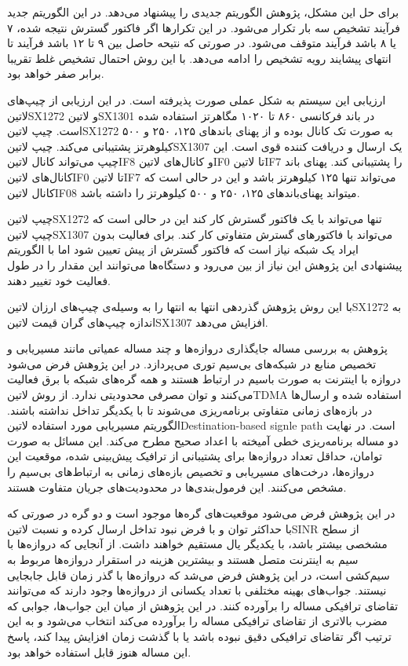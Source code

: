 برای حل این مشکل، پژوهش الگوریتم جدیدی را پیشنهاد می‌دهد. در این الگوریتم جدید فرآیند تشخیص سه بار تکرار می‌شود.
در این تکرارها اگر فاکتور گسترش نتیجه شده، ۷ یا ۸ باشد فرآیند متوقف می‌شود.
در صورتی که نتیحه حاصل بین ۹ تا ۱۲ باشد فرآیند تا انتهای پیشایند رویه تشخیص را ادامه می‌دهد.
با این روش احتمال تشخیص غلط تقریبا برابر صفر خواهد بود.

ارزیابی این سیستم به شکل عملی صورت پذیرفته است. در این ارزیابی از چیپ‌های ‌لاتین{SX1272} و ‌لاتین{SX1301} در باند فرکانسی ۸۶۰ تا ۱۰۲۰ مگاهرتز استفاده شده است.
چیپ ‌لاتین{SX1272} به صورت تک کانال بوده و از پهنای باندهای ۱۲۵، ۲۵۰ و ۵۰۰ کیلوهرتز پشتیبانی می‌کند.
چیپ ‌لاتین{SX1307} یک ارسال و دریافت کننده قوی است. این چیپ می‌تواند کانال ‌لاتین{IF8} و کانال‌های ‌لاتین{IF0} تا ‌لاتین{IF7} را پشتیبانی کند.
پهنای باند کانال‌های ‌لاتین{IF0} تا ‌لاتین{IF7} می‌تواند تنها ۱۲۵ کیلوهرتز باشد و این در حالی است که کانال ‌لاتین{IF08} میتواند پهنای‌باندهای ۱۲۵، ۲۵۰ و ۵۰۰ کیلوهرتز را داشته باشد.

چیپ ‌لاتین{SX1272} تنها می‌تواند با یک فاکتور گسترش کار کند این در حالی است که چیپ ‌لاتین{SX1307} می‌تواند با فاکتورهای گسترش متفاوتی کار کند.
برای فعالیت بدون ایراد یک شبکه نیاز است که فاکتور گسترش از پیش تعیین شود اما با الگوریتم پیشنهادی این پژوهش این نیاز از بین می‌رود و دستگاه‌ها می‌توانند
این مقدار را در طول فعالیت خود تغییر دهند.

با این روش پژوهش گذردهی انتها به انتها را به وسیله‌ی چیپ‌های ارزان ‌لاتین{SX1272} به اندازه چیپ‌های گران قیمت ‌لاتین{SX1307} افزایش می‌دهد.


پژوهش  به بررسی مساله جایگذاری دروازه‌ها و چند مساله عمیاتی مانند مسیریابی و تخصیص منابع در شبکه‌های بی‌سیم توری می‌پردازد.
در این پژوهش فرض می‌شود دروازه با اینترنت به صورت باسیم در ارتباط هستند و همه گره‌های شبکه با برق فعالیت می‌کنند و توان مصرفی محدودیتی ندارد.
از روش ‌لاتین{TDMA} استفاده شده و ارسال‌ها در بازه‌های زمانی متفاوتی برنامه‌ریزی می‌شوند تا با یکدیگر تداخل نداشته باشند.
الگوریتم مسیریابی مورد استفاده ‌لاتین{Destination-based signle path} است.
در نهایت دو مساله برنامه‌ریزی خطی آمیخته با اعداد صحیح مطرح می‌کند.
این مسائل به صورت توامان، حداقل تعداد دروازه‌ها برای پشتیبانی از ترافیک پیش‌بینی شده، موقعیت این دروازه‌ها، درخت‌های مسیریابی و تخصیص بازه‌های زمانی به ارتباط‌های بی‌سیم را مشخص می‌کنند.
این فرمول‌بندی‌ها در محدودیت‌های جریان متفاوت هستند.

در این پژوهش فرض می‌شود موقعیت‌های گره‌ها موجود است و دو گره در صورتی که با حداکثر توان و با فرض نبود تداخل ارسال کرده و نسبت ‌لاتین{SINR} از سطح مشخصی بیشتر باشد،
با یکدیگر یال مستقیم خواهند داشت.
از آنجایی که دروازه‌ها با سیم به اینترنت متصل هستند و بیشترین هزینه در استقرار دروازه‌ها مربوط به سیم‌کشی است، در این پژوهش فرض می‌شد که دروازه‌ها با گذر زمان قابل جابجایی نیستند.
جواب‌های بهینه مختلفی با تعداد یکسانی از دروازه‌ها وجود دارند که می‌توانند تقاضای ترافیکی مساله را برآورده کنند. در این پژوهش از میان این جواب‌ها، جوابی
که مضرب بالاتری از تقاضای ترافیکی مساله را برآورده می‌کند انتخاب می‌شود و به این ترتیب اگر تقاضای ترافیکی دقیق نبوده باشد یا با گذشت زمان افزایش پیدا کند،
پاسخ این مساله هنوز قابل استفاده خواهد بود.

